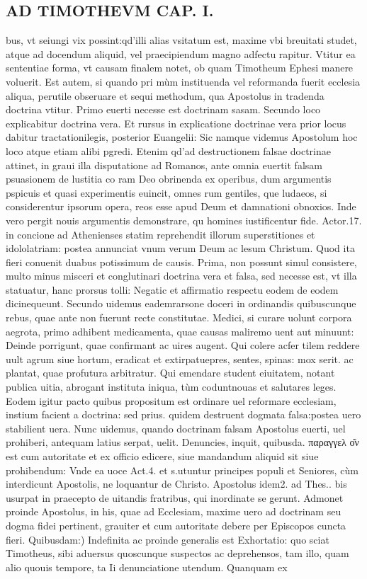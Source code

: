 \documentclass{article}
\begin{document}
\begin{pages}
\section*{AD TIMOTHEVM CAP. I. }
\marginpar{[ p.7 ]}\pstart bus, vt seiungi vix possint:qd'illi alias vsitatum est, maxime vbi breuitati studet, atque  ad docendum aliquid, vel praecipiendum magno adfectu rapitur. Vtitur ea sententiae forma, vt causam finalem notet, ob quam Timotheum Ephesi manere voluerit. Est autem, si quando pri mùm instituenda vel reformanda fuerit ecclesia aliqua, perutile obseruare et sequi methodum, qua Apostolus in tradenda doctrina vtitur. Primo euerti necesse est doctrinam sasam. Secundo loco explicabitur doctrina vera. Et rursus in explicatione doctrinae vera prior locus dabitur tractationilegis, posterior Euangelii: Sic namque  videmus Apostolum hoc loco atque  etiam alibi pgredi. Etenim qd'ad destructionem falsae doctrinae attinet, in graui illa disputatione ad Romanos, ante omnia euertit falsam psuasionem de lustitia co ram Deo obrinenda ex operibus, dum argumentis pspicuis et quasi experimentis euincit, omnes rum gentiles, que  ludaeos, si considerentur ipsorum opera, reos esse apud Deum et damnationi obnoxios. Inde vero pergit nouis argumentis demonstrare, qu homines iustificentur fide. Actor.17. in concione ad Athenienses statim reprehendit illorum superstitiones et idololatriam: postea annunciat vnum verum Deum ac lesum Christum. Quod ita fieri conuenit duabus potissimum de causis. Prima, non possunt simul consistere, multo minus misceri et conglutinari doctrina vera et falsa, sed necesse est, vt illa statuatur, hanc prorsus tolli: Negatic et affirmatio respectu eodem de eodem dicinequeunt. Secundo uidemus eademrarsone doceri in ordinandis quibuscunque  rebus, quae ante non fuerunt recte constitutae. Medici, si curare uolunt corpora aegrota, primo adhibent medicamenta, quae causas maliremo uent aut minuunt: Deinde porrigunt, quae confirmant ac uires augent. Qui colere acfer tilem reddere uult agrum siue hortum, eradicat et extirpatuepres, sentes, spinas: mox serit. ac plantat, quae profutura arbitratur. Qui emendare student eiuitatem, notant publica uitia, abrogant instituta iniqua, tùm coduntnouas et salutares leges. Eodem igitur pacto quibus propositum est ordinare uel reformare ecclesiam, instium facient a doctrina: sed prius. quidem destruent dogmata falsa:postea uero stabilient uera. Nunc uidemus, quando doctrinam falsam Apostolus euerti, uel prohiberi, antequam latius serpat, uelit. Denuncies,   inquit, quibusda. παραγγελ ο͂ν est cum autoritate et ex officio edicere, siue mandandum aliquid sit siue prohibendum: Vnde ea uoce Act.4. et s.utuntur principes populi et Seniores, cùm interdicunt Apostolis, ne loquantur de Christo. Apostolus idem2. ad Thes.. bis usurpat in praecepto de uitandis fratribus, qui inordinate se gerunt. Admonet proinde Apostolus, in his, quae ad Ecclesiam, maxime uero ad doctrinam seu dogma fidei pertinent, grauiter et cum autoritate debere per Episcopos cuncta fieri.  \pend\pstart Quibusdam:) Indefinita ac proinde generalis est Exhortatio: quo sciat Timotheus, sibi aduersus quoscunque  suspectos ac deprehensos, tam illo, quam alio quouis tempore, ta Ii denunciatione utendum. Quanquam ex 
\end{pages}
\end{document}

